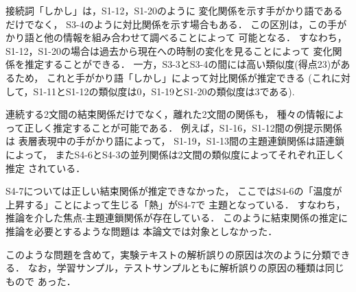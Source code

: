 接続詞「しかし」は，S1-12，S1-20のように
変化関係を示す手がかり語であるだけでなく，
S3-4のように対比関係を示す場合もある．
この区別は，この手がかり語と他の情報を組み合わせて調べることによって
可能となる．
すなわち，S1-12，S1-20の場合は過去から現在への時制の変化を見ることによって
変化関係を推定することができる．
一方，S3-3とS3-4の間には高い類似度(得点23)があるため，
これと手がかり語「しかし」によって対比関係が推定できる
(これに対して，S1-11とS1-12の類似度は0，S1-19とS1-20の類似度は3である). 

連続する2文間の結束関係だけでなく，離れた2文間の関係も，
種々の情報によって正しく推定することが可能である．
例えば，S1-16，S1-12間の例提示関係は
表層表現中の手がかり語によって，
S1-19，S1-13間の主題連鎖関係は語連鎖によって，
またS4-6とS4-3の並列関係は2文間の類似度によってそれぞれ正しく推定
されている．

S4-7については正しい結束関係が推定できなかった，
ここではS4-6の「温度が上昇する」ことによって生じる「熱」がS4-7で
主題となっている．
すなわち，推論を介した焦点-主題連鎖関係が存在している．
このように結束関係の推定に推論を必要とするような問題は
本論文では対象としなかった．

このような問題を含めて，実験テキストの解析誤りの原因は次のように分類できる．
なお，学習サンプル，テストサンプルともに解析誤りの原因の種類は同じもので
あった．

